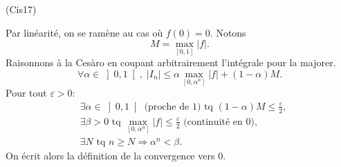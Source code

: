 \begin{tiny}(Cis17)\end{tiny} Par linéarité, on se ramène au cas où $f(0)=0$. Notons 
\[
 M = \max_{[0,1]}|f|.
\]
Raisonnons à la Cesàro en coupant arbitrairement l'intégrale pour la majorer.
\[
 \forall \alpha \in \left] 0,1\right[, \;
 |I_n| \leq \alpha \max_{\left[ 0, \alpha^n\right] }|f| + (1-\alpha)M.
\]
Pour tout $\varepsilon >0$:
\begin{align*}
 &\exists \alpha \in \left] 0,1 \right[ \text{ (proche de $1$) tq } (1-\alpha)M \leq \frac{\varepsilon}{2}, \\
 &\exists \beta >0 \text{ tq } \max_{\left[ 0, \alpha^n\right] }|f| \leq \frac{\varepsilon}{2} \text{ (continuité en $0$)},\\
 &\exists N \text{ tq } n\geq N \Rightarrow \alpha^n < \beta.
\end{align*}
On écrit alors la définition de la convergence vers $0$.